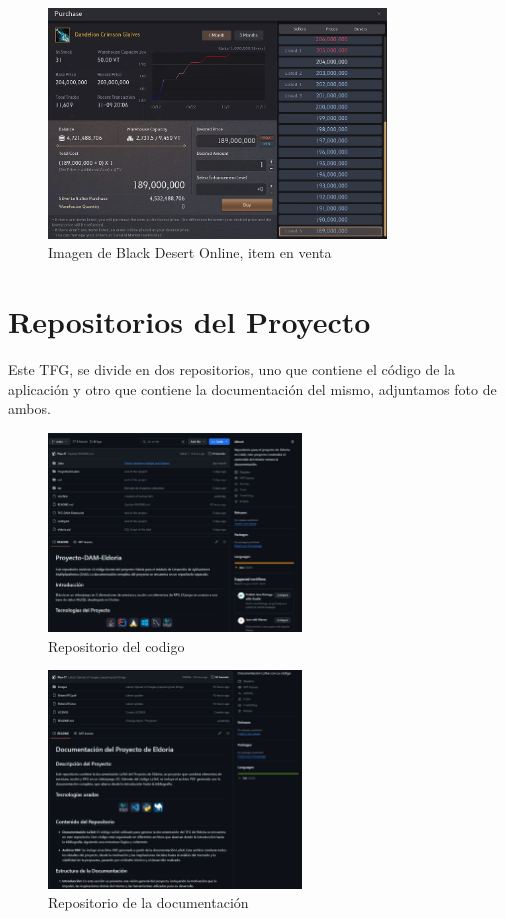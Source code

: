 \documentclass[a4paper]{article}
\begin{document}
\begin{figure}[ht]
    \centering
    \includegraphics[width=0.8\textwidth]{Images/itemblackdesert.png}
    \caption{Imagen de Black Desert Online, item en venta}
    \label{fig:fullscreen}
\end{figure}
\clearpage
\section{Repositorios del Proyecto}
Este TFG, se divide en dos repositorios, uno que contiene el código de la aplicación y otro que contiene la documentación del mismo, adjuntamos foto de ambos.
\begin{figure}[ht]
    \centering
    \includegraphics[width=0.6\textwidth]{Images/codigorepo.png}
    \caption{Repositorio del codigo}
    \label{fig:codigorepo}
\end{figure}
\begin{figure}[ht]
    \centering
    \includegraphics[width=0.6\textwidth]{Images/documentacionrepo.png}
    \caption{Repositorio de la documentación}
    \label{fig:documentacionrepo}
\end{figure}
\clearpage
\end{document}
